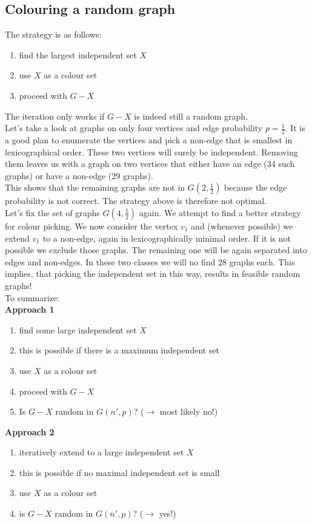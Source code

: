\documentclass[a4paper, 12pt]{article}
\begin{document}
	\subsection{Colouring a random graph}
	The strategy is as follows: \begin{enumerate}
		\item find the largest independent set $X$
		\item use $X$ as a colour set
		\item proceed with $G-X$
	\end{enumerate}
	The iteration only works if $G-X$ is indeed still a random graph.\\
	
	Let's take a look at graphs on only four vertices and edge probability $p = \frac{1}{2}$.
	It is a good plan to enumerate the vertices and pick a non-edge that is smallest in lexicographical order. These two vertices will surely be independent. Removing them leaves us with a graph on two vertices that either have an edge (34 such graphs) or have a non-edge (29 graphs).\\
	This shows that the remaining graphs are not in $G(2,\frac{1}{2})$ because the edge probability is not correct. The strategy above is therefore not optimal.\\
	
	Let's fix the set of graphs $G(4,\frac{1}{2})$ again. We attempt to find a better strategy for colour picking. We now consider the vertex $v_1$ and (whenever possible) we extend $v_1$ to a non-edge, again in lexicographically minimal order. If it is not possible we exclude those graphs. The remaining one will be again separated into edges and non-edges. In these two classes we will no find 28 graphs each. This implies, that picking the independent set in this way, results in feasible random graphs!\\
	
	To summarize:\\
	\textbf{Approach 1}
	\begin{enumerate}
		\item find some large independent set $X$
		\item this is possible if there is a maximum independent set
		\item use $X$ as a colour set
		\item proceed with $G-X$
		\item Is $G-X$ random in $G(n',p)$? ($\rightarrow$ most likely no!)
	\end{enumerate}
	\textbf{Approach 2}
	\begin{enumerate}
		\item iteratively extend to a large independent set $X$
		\item this is possible if no maximal independent set is small
		\item use $X$ as a colour set
		\item is $G-X$ random in $G(n',p)$? ($\rightarrow$ yes!)
	\end{enumerate}
\end{document}
